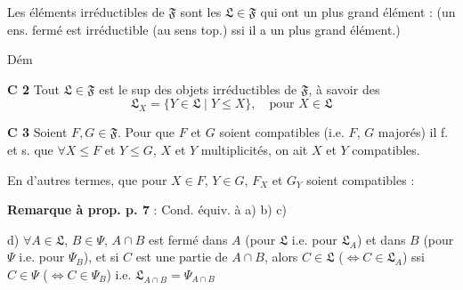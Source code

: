 \documentclass[11pt,a4paper]{article}
\begin{document}


Les éléments irréductibles de $\mathfrak{F}$ sont les $\mathfrak{L} \in \mathfrak{F}$ qui ont  un plus grand élément : (un ens. fermé est irréductible (au sens top.) ssi il a un plus grand élément.)


Dém

\textbf{C 2} Tout $\mathfrak{L} \in \mathfrak{F}$ est le sup des objets irréductibles de $\mathfrak{F}$, à savoir des
\[
  \mathfrak{L}_X = \{ Y \in \mathfrak{L} \mid Y \leq X \} , \quad \text{pour } X \in \mathfrak{L}
\]

\textbf{C 3} Soient $F, G \in \mathfrak{F}$. Pour que $F$ et $G$ soient compatibles (i.e. $F$, $G$ majorés) il f. et s. que  $\forall X \leq F$ et $Y \leq G$, \struck{\ill{}} $X$ et $Y$ \struck{\ill{}} multiplicités, on ait $X$ et $Y$ compatibles.

En d'autres termes, que pour $X \in F$, $Y \in G$, $F_X$ et $G_Y$ soient compatibles :

\textbf{Remarque à prop. p. 7} : Cond. équiv. à a) b) c)

d)  $\forall A \in \mathfrak{L}$, $B \in \Psi$, $A \cap B$ est fermé dans $A$ (pour $\mathfrak{L}$ i.e. pour $\mathfrak{L}_A$) et dans $B$ (pour $\Psi$ i.e. pour $\Psi_B$), et si  $C$ est une partie de $A \cap B$, alors $C \in \mathfrak{L}$ ($\Leftrightarrow C \in \mathfrak{L}_A$) ssi $C \in \Psi$ ($\Leftrightarrow C \in \Psi_B$) i.e. $\mathfrak{L}_{A \cap B} = \Psi_{A \cap B}$
\end{document}
